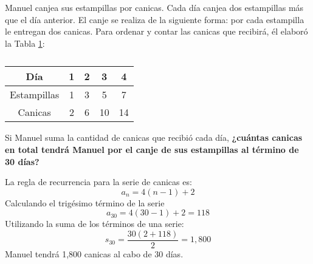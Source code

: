 Manuel canjea sus estampillas por canicas. Cada día canjea dos estampillas más que el día anterior.
El canje se realiza de la siguiente forma: por cada estampilla le entregan dos canicas.
Para ordenar y contar las canicas que recibirá, él elaboró la Tabla \ref{tab:estampillas}:

\begin{table}[H]
    \centering
    \caption{}
    \label{tab:estampillas}
    \begin{tabular}{c|c|c|c|c}
        Día         & 1 & 2 & 3  & 4  \\ \hline
        Estampillas & 1 & 3 & 5  & 7  \\ \hline
        Canicas     & 2 & 6 & 10 & 14
    \end{tabular}
\end{table}

Si Manuel suma la cantidad de canicas que recibió cada día,
\textbf{¿cuántas canicas en total tendrá Manuel por el canje de sus estampillas al término de 30 días?}\\

\begin{solutionbox}{6cm}
    La regla de recurrencia para la serie de canicas es:
    \[a_n=4(n-1)+2\]
    Calculando el trigésimo término de la serie
    \[a_{30}=4(30-1)+2=118\]
    Utilizando la suma de los términos de una serie:
    \[s_{30}=\dfrac{30(2+118)}{2}=1,800\]
    Manuel tendrá 1,800 canicas al cabo de 30 días.
\end{solutionbox}
